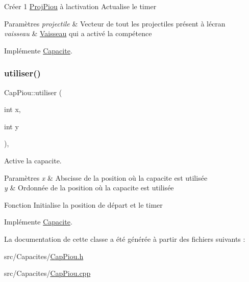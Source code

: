 Créer 1 \hyperlink{class_proj_piou}{Proj\+Piou} à l\textquotesingle{}activation Actualise le timer 
\begin{DoxyParams}{Paramètres}
{\em projectile} & Vecteur de tout les projectiles présent à l\textquotesingle{}écran \\
\hline
{\em vaisseau} & \hyperlink{class_vaisseau}{Vaisseau} qui a activé la compétence \\
\hline
\end{DoxyParams}


Implémente \hyperlink{class_capacite_a75c9621d7a704fedb10ad29c6a697d64}{Capacite}.

\mbox{\label{class_cap_piou_aad0eb3b9fab67785e1d0441b96aa921f}} 
\subsubsection{\texorpdfstring{utiliser()}{utiliser()}}
{\footnotesize\ttfamily Cap\+Piou\+::utiliser (\begin{DoxyParamCaption}\item[{int}]{x,  }\item[{int}]{y }\end{DoxyParamCaption})\hspace{0.3cm}{\ttfamily [override]}, {\ttfamily [virtual]}}



Active la capacite. 


\begin{DoxyParams}{Paramètres}
{\em x} & Abscisse de la position où la capacite est utilisée \\
\hline
{\em y} & Ordonnée de la position où la capacite est utilisée\\
\hline
\end{DoxyParams}
Fonction Initialise la position de départ et le timer 

Implémente \hyperlink{class_capacite_a6f5e6efda11f80ab8538e23f5bdc6e79}{Capacite}.



La documentation de cette classe a été générée à partir des fichiers suivants \+:\begin{DoxyCompactItemize}
\item 
src/\+Capacites/\hyperlink{_cap_piou_8h}{Cap\+Piou.\+h}\item 
src/\+Capacites/\hyperlink{_cap_piou_8cpp}{Cap\+Piou.\+cpp}\end{DoxyCompactItemize}
